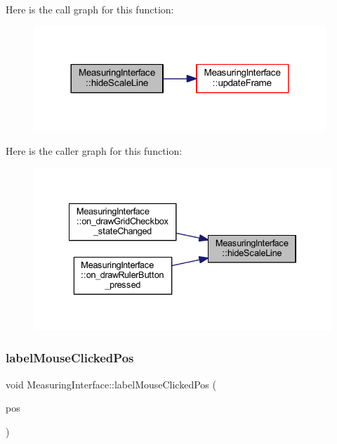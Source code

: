 Here is the call graph for this function\+:
\nopagebreak
\begin{figure}[H]
\begin{center}
\leavevmode
\includegraphics[width=312pt]{class_measuring_interface_ad6344a968dacd55de9a7509698442d67_cgraph}
\end{center}
\end{figure}
Here is the caller graph for this function\+:
\nopagebreak
\begin{figure}[H]
\begin{center}
\leavevmode
\includegraphics[width=334pt]{class_measuring_interface_ad6344a968dacd55de9a7509698442d67_icgraph}
\end{center}
\end{figure}
\mbox{\label{class_measuring_interface_a02eaf8106ec4eb62d0057c6d447f94c5}} 
\subsubsection{\texorpdfstring{labelMouseClickedPos}{labelMouseClickedPos}}
{\footnotesize\ttfamily void Measuring\+Interface\+::label\+Mouse\+Clicked\+Pos (\begin{DoxyParamCaption}\item[{Q\+Point \&}]{pos }\end{DoxyParamCaption})\hspace{0.3cm}{\ttfamily [slot]}}



